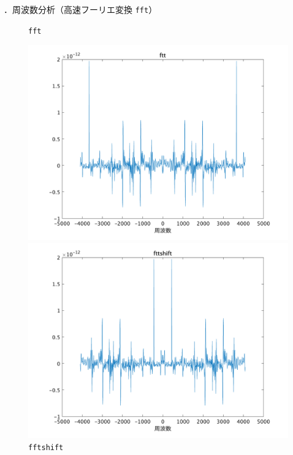 \documentclass[aspectratio=43]{beamer}
\newcommand{\showsec}{\thesection ．}
\begin{document}
\begin{frame}[t]{\showsec 周波数分析（高速フーリエ変換 \texttt{fft}）}
    \begin{figure}
        \centering
        \begin{minipage}{.49\textwidth}
            \caption{\texttt{fft}}
            \includegraphics[keepaspectratio,width=\textwidth]{fft_fft.png}
        \end{minipage}
        \begin{minipage}{.49\textwidth}
            \caption{\texttt{fftshift}}
            \includegraphics[keepaspectratio,width=\textwidth]{fft_fftshift.png}
        \end{minipage}
    \end{figure}
\end{frame}
\end{document}
